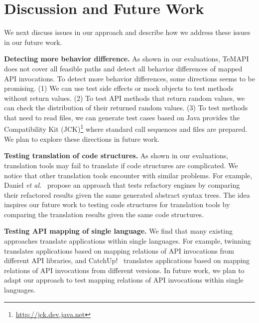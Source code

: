 

\section{Discussion and Future Work}
\label{sec:discuss}

We next discuss issues in our approach and describe how we address
these issues in our future work.

\textbf{Detecting more behavior difference.} As shown in our evaluations, TeMAPI does not cover all feasible paths and detect all behavior differences of mapped API invocations. To detect more behavior differences, some directions seems to be promising. (1) We can use test side effects or  mock objects to test methods without return values. (2) To test API methods that return random values, we can check the distribution of their returned random values. (3) To test methods that need to read files, we can generate test cases based on Java provides the Compatibility Kit (JCK)\footnote{\url{http://jck.dev.java.net}} where standard call sequences and files are prepared. We plan to explore these directions in future work.

\textbf{Testing translation of code structures.} As shown in our evaluations, translation tools may fail to translate if code structures are complicated. We notice that other translation tools encounter with similar problems. For example, Daniel \emph{et al.}~\cite{daniel2007automated} propose an approach that tests refactory engines by comparing their refactored results given the same generated abstract syntax trees. The idea inspires our future work to testing code structures for translation tools by comparing the translation results given the same code structures.

\textbf{Testing API mapping of single language.} We find that many existing approaches translate applications within single languages. For example, twinning~\cite{nita2010using} translates applications based on mapping relations of API invocations from different API libraries, and CatchUp!~\cite{henkel2005catchup} translates applications based on mapping relations of API invocations from different versions. In future work, we plan to adapt our approach to test mapping relations of API invocations within single languages. 